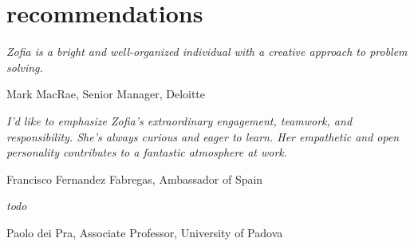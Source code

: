 \documentclass[]{appsilon} %
\begin{document}
\section{recommendations}
\emph{Zofia is a bright and well-organized individual with a creative approach to problem solving.}
\begin{flushright}
	Mark MacRae, Senior Manager, Deloitte
\end{flushright}

\emph{I'd like to emphasize Zofia's extraordinary engagement, teamwork, and responsibility. She's always curious and eager to learn. Her empathetic and open personality contributes to a fantastic atmosphere at work.}
\begin{flushright}
	Francisco Fernandez Fabregas, Ambassador of Spain
\end{flushright}


\emph{todo}
\begin{flushright}
Paolo dei Pra, Associate Professor, University of Padova
\end{flushright}

%

\end{document}
